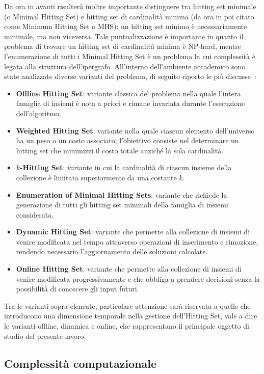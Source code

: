 Da ora in avanti risulterà inoltre importante distinguere tra hitting set minimale (o Minimal Hitting Set) e hitting set di cardinalità minima (da ora in poi citato come Minimum Hitting Set o MHS): un hitting set minimo è necessariamente minimale, ma non viceversa.
Tale puntualizzazione è importante in quanto il problema di trovare un hitting set di cardinalità minima è NP-hard, mentre l'enumerazione di tutti i Minimal Hitting Set è un problema la cui complessità è legata alla struttura dell'ipergrafo.
All'interno dell'ambiente accademico sono state analizzate diverse varianti del problema, di seguito riporto le più discusse~\cite{gainer2017}:
\begin{itemize}
    \item \textbf{Offline Hitting Set}: variante classica del problema nella quale l'intera famiglia di insiemi è nota a priori e rimane invariata durante l'esecuzione dell'algoritmo.
    \item \textbf{Weighted Hitting Set}: variante nella quale ciascun elemento dell'universo ha un peso o un costo associato; l'obiettivo consiste nel determinare un hitting set che minimizzi il costo totale anziché la sola cardinalità.
    \item \textbf{$k$-Hitting Set}: variante in cui la cardinalità di ciascun insieme della collezione è limitata superiormente da una costante $k$.
    \item \textbf{Enumeration of Minimal Hitting Sets}: variante che richiede la generazione di tutti gli hitting set minimali della famiglia di insiemi considerata.
    \item \textbf{Dynamic Hitting Set}: variante che permette alla collezione di insiemi di venire modificata nel tempo attraverso operazioni di inserimento e rimozione, rendendo necessario l'aggiornamento delle soluzioni calcolate.
    \item \textbf{Online Hitting Set}: variante che permette alla collezione di insiemi di venire modificata progressivamente e che obbliga a prendere decisioni senza la possibilità di conoscere gli input futuri.
\end{itemize}
Tra le varianti sopra elencate, particolare attenzione sarà riservata a quelle che introducono una dimensione temporale nella gestione dell’Hitting Set, vale a dire le varianti offline, dinamica e online, che rappresentano il principale oggetto di studio del presente lavoro.

\subsection{Complessità computazionale}

